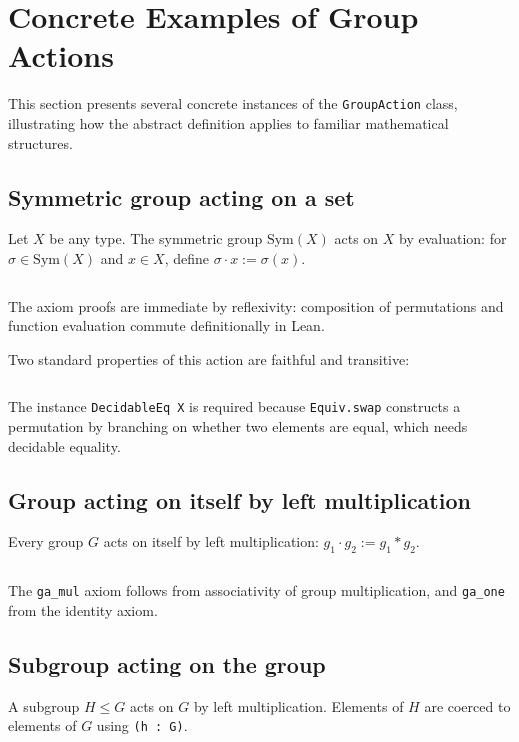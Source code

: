 \documentclass[
  12pt, %
]{assignment}
\newcommand{\leancodeurl}{}
\newcommand{\setleancodeurl}[1]{\renewcommand{\leancodeurl}{#1}}
\newcommand{\leancodefile}[3][]{%
  \setleancodeurl{#3}%
  \inputminted[fontsize=\footnotesize,breaklines,breakanywhere,tabsize=4,showspaces=false,linenos=true,#1]{lean4}{#2}%
}
\begin{document}
\section{Concrete Examples of Group Actions}
This section presents several concrete instances of the \texttt{GroupAction} class,
illustrating how the abstract definition applies to familiar mathematical structures.

\subsection{Symmetric group acting on a set}
Let $X$ be any type. The symmetric group $\mathrm{Sym}(X)$ acts on $X$ by evaluation:
for $\sigma \in \mathrm{Sym}(X)$ and $x \in X$, define $\sigma \cdot x := \sigma(x)$.

\leancodefile[firstline=19,lastline=26,firstnumber=19]{../lean/GroupAction/Examples.lean}{https://github.com/FrankieeW/GroupAction/blob/v1.0.0/lean/GroupAction/Examples.lean}

The axiom proofs are immediate by reflexivity: composition of permutations and function
evaluation commute definitionally in Lean.

Two standard properties of this action are faithful and transitive:
\leancodefile[firstline=28,lastline=42,firstnumber=28]{../lean/GroupAction/Examples.lean}{https://github.com/FrankieeW/GroupAction/blob/v1.0.0/lean/GroupAction/Examples.lean}
The instance \texttt{DecidableEq X} is required because \texttt{Equiv.swap} constructs a
permutation by branching on whether two elements are equal, which needs decidable equality.

\subsection{Group acting on itself by left multiplication}
Every group $G$ acts on itself by left multiplication: $g_1 \cdot g_2 := g_1 * g_2$.

\leancodefile[firstline=44,lastline=51,firstnumber=44]{../lean/GroupAction/Examples.lean}{https://github.com/FrankieeW/GroupAction/blob/v1.0.0/lean/GroupAction/Examples.lean}

The \texttt{ga\_mul} axiom follows from associativity of group multiplication, and
\texttt{ga\_one} from the identity axiom.

\subsection{Subgroup acting on the group}
A subgroup $H \leq G$ acts on $G$ by left multiplication. Elements of $H$ are coerced
to elements of $G$ using \texttt{(h : G)}.
\end{document}
